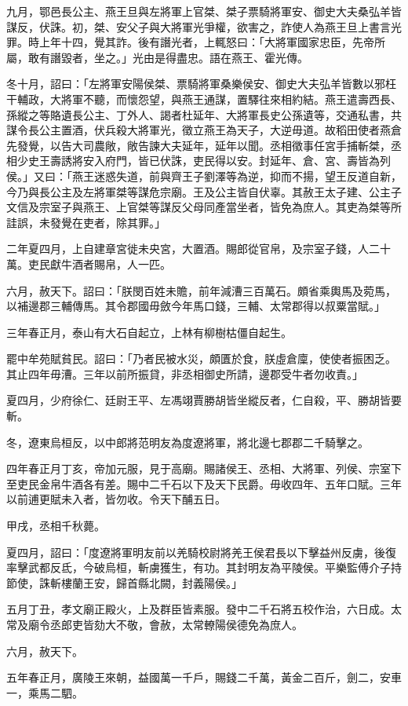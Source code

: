 \begin{pinyinscope}
九月，鄂邑長公主、燕王旦與左將軍上官桀、桀子票騎將軍安、御史大夫桑弘羊皆謀反，伏誅。初，桀、安父子與大將軍光爭權，欲害之，詐使人為燕王旦上書言光罪。時上年十四，覺其詐。後有譖光者，上輒怒曰：「大將軍國家忠臣，先帝所屬，敢有譖毀者，坐之。」光由是得盡忠。語在燕王、霍光傳。

冬十月，詔曰：「左將軍安陽侯桀、票騎將軍桑樂侯安、御史大夫弘羊皆數以邪枉干輔政，大將軍不聽，而懷怨望，與燕王通謀，置驛往來相約結。燕王遣壽西長、孫縱之等賂遺長公主、丁外人、謁者杜延年、大將軍長史公孫遺等，交通私書，共謀令長公主置酒，伏兵殺大將軍光，徵立燕王為天子，大逆毋道。故稻田使者燕倉先發覺，以告大司農敞，敞告諫大夫延年，延年以聞。丞相徵事任宮手捕斬桀，丞相少史王壽誘將安入府門，皆已伏誅，吏民得以安。封延年、倉、宮、壽皆為列侯。」又曰：「燕王迷惑失道，前與齊王子劉澤等為逆，抑而不揚，望王反道自新，今乃與長公主及左將軍桀等謀危宗廟。王及公主皆自伏辜。其赦王太子建、公主子文信及宗室子與燕王、上官桀等謀反父母同產當坐者，皆免為庶人。其吏為桀等所詿誤，未發覺在吏者，除其罪。」

二年夏四月，上自建章宮徙未央宮，大置酒。賜郎從官帛，及宗室子錢，人二十萬。吏民獻牛酒者賜帛，人一匹。

六月，赦天下。詔曰：「朕閔百姓未贍，前年減漕三百萬石。頗省乘輿馬及菀馬，以補邊郡三輔傳馬。其令郡國毋斂今年馬口錢，三輔、太常郡得以叔粟當賦。」

三年春正月，泰山有大石自起立，上林有柳樹枯僵自起生。

罷中牟苑賦貧民。詔曰：「乃者民被水災，頗匱於食，朕虛倉廩，使使者振困乏。其止四年毋漕。三年以前所振貸，非丞相御史所請，邊郡受牛者勿收責。」

夏四月，少府徐仁、廷尉王平、左馮翊賈勝胡皆坐縱反者，仁自殺，平、勝胡皆要斬。

冬，遼東烏桓反，以中郎將范明友為度遼將軍，將北邊七郡郡二千騎擊之。

四年春正月丁亥，帝加元服，見于高廟。賜諸侯王、丞相、大將軍、列侯、宗室下至吏民金帛牛酒各有差。賜中二千石以下及天下民爵。毋收四年、五年口賦。三年以前逋更賦未入者，皆勿收。令天下酺五日。

甲戌，丞相千秋薨。

夏四月，詔曰：「度遼將軍明友前以羌騎校尉將羌王侯君長以下擊益州反虜，後復率擊武都反氐，今破烏桓，斬虜獲生，有功。其封明友為平陵侯。平樂監傅介子持節使，誅斬樓蘭王安，歸首縣北闕，封義陽侯。」

五月丁丑，孝文廟正殿火，上及群臣皆素服。發中二千石將五校作治，六日成。太常及廟令丞郎吏皆劾大不敬，會赦，太常轑陽侯德免為庶人。

六月，赦天下。

五年春正月，廣陵王來朝，益國萬一千戶，賜錢二千萬，黃金二百斤，劍二，安車一，乘馬二駟。


\end{pinyinscope}
